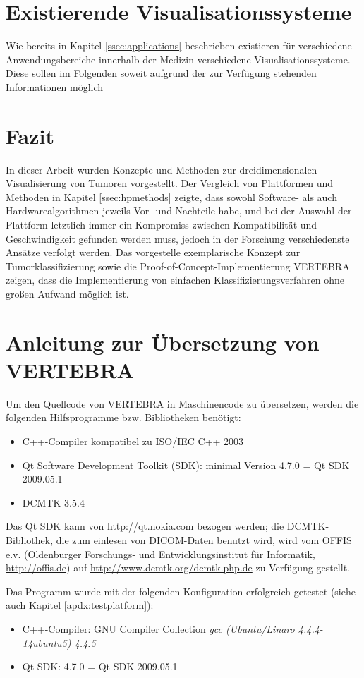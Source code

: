 \documentclass[a4paper,titlepage,12pt]{scrartcl}
\newtheorem[L]{boxedDefinition}{Definition}
\begin{document}
\section{Existierende Visualisationssysteme} \label{ssec:existingtvss}
Wie bereits in Kapitel \vref{ssec:applications} beschrieben existieren für verschiedene Anwendungsbereiche innerhalb der Medizin verschiedene Visualisationssysteme. Diese sollen im Folgenden soweit aufgrund der zur Verfügung stehenden Informationen möglich

\section{Fazit}
In dieser Arbeit wurden Konzepte und Methoden zur dreidimensionalen Visualisierung von Tumoren vorgestellt.
Der Vergleich von Plattformen und Methoden in Kapitel \ref{ssec:hpmethods} zeigte, dass sowohl Software- als auch Hardwarealgorithmen jeweils Vor- und Nachteile habe, und bei der Auswahl der Plattform letztlich immer ein Kompromiss zwischen Kompatibilität und Geschwindigkeit gefunden werden muss, jedoch in der Forschung verschiedenste Ansätze verfolgt werden. Das vorgestelle exemplarische Konzept zur Tumorklassifizierung sowie die Proof-of-Concept-Implementierung VERTEBRA zeigen, dass die Implementierung von einfachen Klassifizierungsverfahren ohne großen Aufwand möglich ist. 

\appendix \label{appendixstart}
\section{Anleitung zur Übersetzung von VERTEBRA}
Um den Quellcode von VERTEBRA in Maschinencode zu übersetzen, werden die folgenden Hilfsprogramme bzw. Bibliotheken benötigt:
\begin{itemize}
 \item C++-Compiler kompatibel zu ISO/IEC C++ 2003
 \item Qt Software Development Toolkit (SDK): minimal Version 4.7.0 = Qt SDK 2009.05.1
 \item DCMTK 3.5.4
\end{itemize}

Das Qt SDK kann von \url{http://qt.nokia.com} bezogen werden; die DCMTK-Bibliothek, die zum einlesen von DICOM-Daten benutzt wird, wird vom OFFIS e.v. (Oldenburger Forschungs- und Entwicklungsinstitut für Informatik, \url{http://offis.de}) auf \url{http://www.dcmtk.org/dcmtk.php.de} zu Verfügung gestellt.

Das Programm wurde mit der folgenden Konfiguration erfolgreich getestet (siehe auch Kapitel \vref{apdx:testplatform}):
\begin{itemize}
 \item C++-Compiler: GNU Compiler Collection \textit{gcc (Ubuntu/Linaro 4.4.4-14ubuntu5) 4.4.5}
 \item Qt SDK: 4.7.0 = Qt SDK 2009.05.1
\end{itemize}
\end{document}
